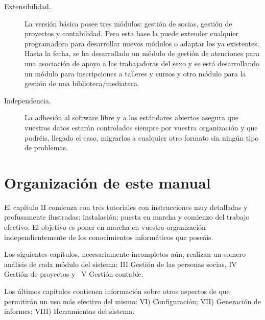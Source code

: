 \begin{description}
\item[Extensibilidad.]
La versión básica posee tres módulos: gestión de socias,
gestión de proyectos y contabilidad. Pero esta base la puede extender
cualquier programadora para desarrollar nuevos módulos o adaptar los
ya existentes. Hasta la fecha, se ha desarrollado un módulo de
gestión de atenciones para una asociación de apoyo a las
trabajadoras del sexo y se está desarrollando un módulo para
inscripciones a talleres y cursos y otro módulo para la gestión de
una biblioteca/mediateca.


\item[Independencia.]
La adhesión al software libre y a los estándares abiertos asegura
que vuestros datos estarán controlados siempre por vuestra
organización y que podréis, llegado el caso, migrarlos a cualquier
otro formato sin ningún tipo de problemas.

\end{description}



\section{Organización de este manual}
El capítulo II comienza con tres tutoriales con instrucciones muy
detalladas y profusamente ilustradas: instalación; puesta en marcha y
comienzo del trabajo efectivo. El objetivo es poner en marcha \appname
en vuestra organización independientemente de los conocimientos
informáticos que poseáis.

Los siguientes capítulos, necesariamente incompletos aún, realizan
un somero análisis de cada módulo del sistema: III Gestión de las
personas socias, IV Gestión de proyectos y \ V Gestión contable.

Los últimos capítulos contienen información sobre otros aspectos
de \appname que permitirán un uso más efectivo del mismo: VI)
Configuración; VII) Generación de informes; VIII) Herramientas del
sistema.




